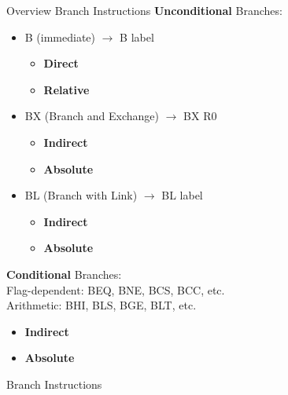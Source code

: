 \begin{concept}{Overview Branch Instructions}
\textcolor{darkcorn}{\textbf{Unconditional}} Branches:
\begin{itemize}
    \item B (immediate)  $\rightarrow$ B label
    \begin{itemize}
        \item \textcolor{darktangerine}{\textbf{Direct}}
        \item \textcolor{darkfrog}{\textbf{Relative}}
    \end{itemize}
    \item BX (Branch and Exchange) $\rightarrow$ BX R0
    \begin{itemize}
        \item \textcolor{darktangerine}{\textbf{Indirect}}
        \item \textcolor{darkfrog}{\textbf{Absolute}}
    \end{itemize}
    \item BL (Branch with Link) $\rightarrow$ BL label
    \begin{itemize} 
        \item \textcolor{darktangerine}{\textbf{Indirect}}
        \item \textcolor{darkfrog}{\textbf{Absolute}}
    \end{itemize}
\end{itemize}

\textcolor{darkcorn}{\textbf{Conditional}} Branches:\\
Flag-dependent: BEQ, BNE, BCS, BCC, etc.\\
Arithmetic: BHI, BLS, BGE, BLT, etc.
\begin{itemize}
    \item \textcolor{darktangerine}{\textbf{Indirect}}
    \item \textcolor{darkfrog}{\textbf{Absolute}}
\end{itemize}
\end{concept}

\begin{KR}{Branch Instructions}\\
\end{KR}




